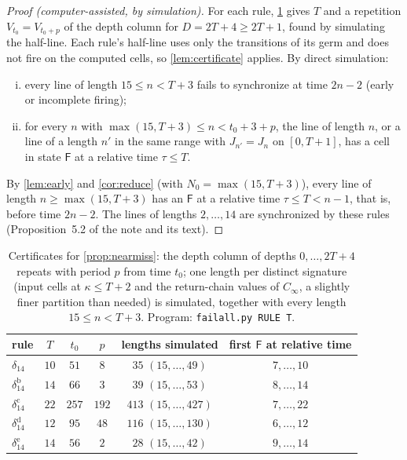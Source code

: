 \documentclass[11pt]{article}
\theoremstyle{definition}
\theoremstyle{remark}
\newcommand{\Fq}{\mathsf F}
\begin{document}
\begin{proof}[Proof (computer-assisted, by simulation)]
For each rule, \cref{tab:certificates} gives $T$ and a repetition
$V_{t_0}=V_{t_0+p}$ of the depth column for $D=2T+4\ge2T+1$, found by
simulating the half-line. Each rule's half-line uses only the transitions of its
germ and does not fire on the computed cells, so \cref{lem:certificate} applies.
By direct simulation:
\begin{enumerate}[(i)]
\item every line of length $15\le n<T+3$ fails to synchronize at time $2n-2$
(early or incomplete firing);
\item for every $n$ with $\max(15,T+3)\le n<t_0+3+p$, the line of length $n$, or
a line of a length $n'$ in the same range with $J_{n'}=J_n$ on $[0,T+1]$, has a
cell in state $\Fq$ at a relative time $\tau\le T$.
\end{enumerate}
By \cref{lem:early} and \cref{cor:reduce} (with $N_0=\max(15,T+3)$), every line
of length $n\ge\max(15,T+3)$ has an $\Fq$ at a relative time $\tau\le T<n-1$,
that is, before time $2n-2$.
The lines of lengths $2,\dots,14$ are synchronized by these rules
(Proposition~5.2 of the note and its text).
\end{proof}

\begin{table}[ht]
\centering\small
\begin{tabular}{@{}lccccc@{}}
\toprule
rule & $T$ & $t_0$ & $p$ & lengths simulated & first $\Fq$ at relative time\\
\midrule
$\delta_{14}$ & $10$ & $51$ & $8$ & $35$ $(15,\dots,49)$ & $7,\dots,10$\\
$\delta_{14}^{\mathrm b}$ & $14$ & $66$ & $3$ & $39$ $(15,\dots,53)$ & $8,\dots,14$\\
$\delta_{14}^{\mathrm c}$ & $22$ & $257$ & $192$ & $413$ $(15,\dots,427)$ & $7,\dots,22$\\
$\delta_{14}^{\mathrm d}$ & $12$ & $95$ & $48$ & $116$ $(15,\dots,130)$ & $6,\dots,12$\\
$\delta_{14}^{\mathrm e}$ & $14$ & $56$ & $2$ & $28$ $(15,\dots,42)$ & $9,\dots,14$\\
\bottomrule
\end{tabular}
\caption{Certificates for \cref{prop:nearmiss}: the depth column of
depths $0,\dots,2T+4$ repeats with period $p$ from time $t_0$; one length per
distinct signature (input cells at $\kappa\le T+2$ and the return-chain values
of $C_\infty$, a slightly finer partition than needed) is simulated, together
with every length $15\le n<T+3$. Program: \texttt{failall.py RULE T}.}
\label{tab:certificates}
\end{table}
\end{document}
